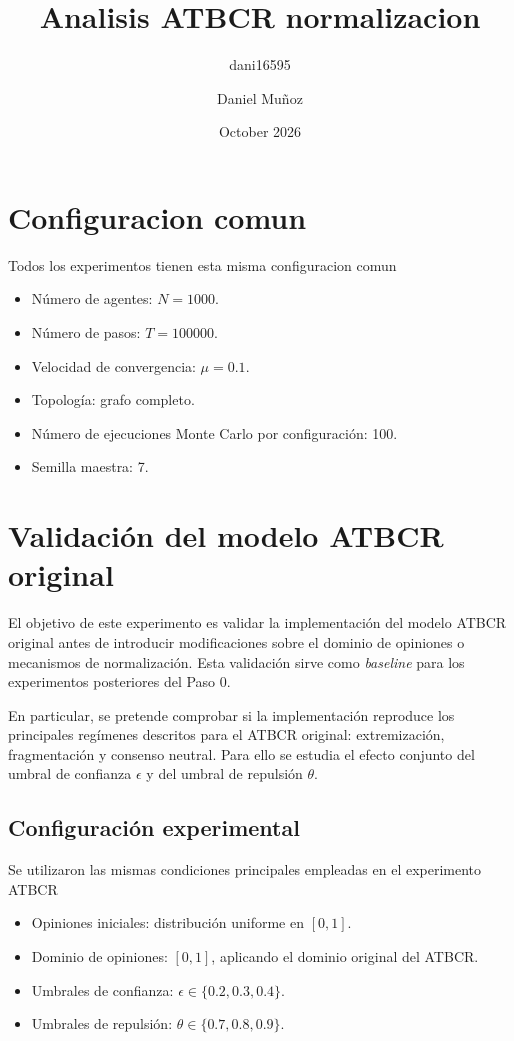 \documentclass[11pt,a4paper]{article}
\title{Analisis ATBCR normalizacion}
\author{dani16595 }
\date{October 2026}
\begin{document}
\maketitle

\author{Daniel Muñoz}

\tableofcontents
\newpage

\section{Configuracion comun}
Todos los experimentos tienen esta misma configuracion comun

\begin{itemize}
    \item Número de agentes: $N=1000$.
    \item Número de pasos: $T=100000$.
    \item Velocidad de convergencia: $\mu=0.1$.
    \item Topología: grafo completo.
    \item Número de ejecuciones Monte Carlo por configuración: 100.
    \item Semilla maestra: 7.
\end{itemize}


\section{Validación del modelo ATBCR original}

El objetivo de este experimento es validar la implementación del modelo ATBCR original antes de introducir modificaciones sobre el dominio de opiniones o mecanismos de normalización. Esta validación sirve como \emph{baseline} para los experimentos posteriores del Paso 0.

En particular, se pretende comprobar si la implementación reproduce los principales regímenes descritos para el ATBCR original: extremización, fragmentación y consenso neutral. Para ello se estudia el efecto conjunto del umbral de confianza $\epsilon$ y del umbral de repulsión $\theta$.

\subsection{Configuración experimental}

Se utilizaron las mismas condiciones principales empleadas en el experimento ATBCR

\begin{itemize}
    \item Opiniones iniciales: distribución uniforme en $[0,1]$.
    \item Dominio de opiniones: $[0,1]$, aplicando el dominio original del ATBCR.
    \item Umbrales de confianza: $\epsilon\in\{0.2,0.3,0.4\}$.
    \item Umbrales de repulsión: $\theta\in\{0.7,0.8,0.9\}$.
\end{itemize}
\end{document}
